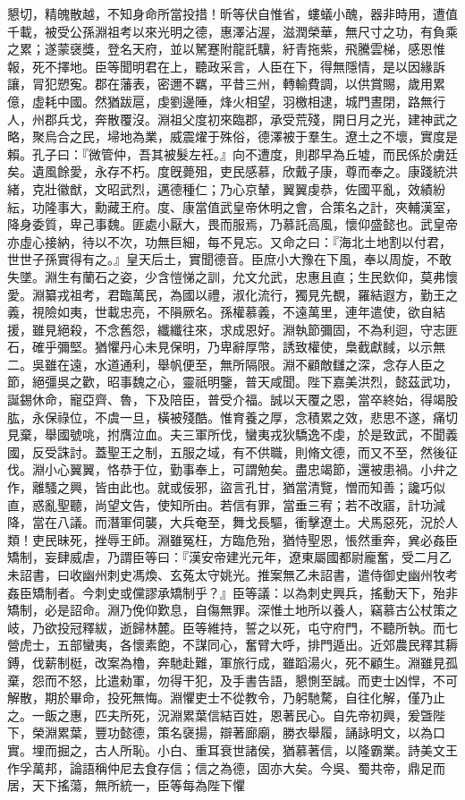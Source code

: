 \begin{pinyinscope}
懇切，精魄散越，不知身命所當投措！昕等伏自惟省，螻蟻小醜，器非時用，遭值千載，被受公孫淵祖考以來光明之德，惠澤沾渥，滋潤榮華，無尺寸之功，有負乘之累；遂蒙襃獎，登名天府，並以駑蹇附龍託驥，紆青拖紫，飛騰雲梯，感恩惟報，死不擇地。臣等聞明君在上，聽政采言，人臣在下，得無隱情，是以因緣訴讓，冐犯愬寃。郡在藩表，密邇不羈，平昔三州，轉輸費調，以供賞賜，歲用累億，虛耗中國。然猶跋扈，虔劉邊陲，烽火相望，羽檄相逮，城門晝閉，路無行人，州郡兵戈，奔散覆沒。淵祖父度初來臨郡，承受荒殘，開日月之光，建神武之略，聚烏合之民，埽地為業，威震燿于殊俗，德澤被于羣生。遼土之不壞，實度是賴。孔子曰：『微管仲，吾其被髮左衽。』向不遭度，則郡早為丘墟，而民係於虜廷矣。遺風餘愛，永存不朽。度旣薨殂，吏民感慕，欣戴子康，尊而奉之。康踐統洪緒，克壯徽猷，文昭武烈，邁德種仁；乃心京輦，翼翼虔恭，佐國平亂，效績紛紜，功隆事大，勳藏王府。度、康當值武皇帝休明之會，合策名之計，夾輔漢室，降身委質，卑己事魏。匪處小厭大，畏而服焉，乃慕託高風，懷仰盛懿也。武皇帝亦虛心接納，待以不次，功無巨細，每不見忘。又命之曰：『海北土地割以付君，世世子孫實得有之。』皇天后土，實聞德音。臣庶小大豫在下風，奉以周旋，不敢失墜。淵生有蘭石之姿，少含愷悌之訓，允文允武，忠惠且直；生民欽仰，莫弗懷愛。淵纂戎祖考，君臨萬民，為國以禮，淑化流行，獨見先覩，羅結遐方，勤王之義，視險如夷，世載忠亮，不隕厥名。孫權慕義，不遠萬里，連年遣使，欲自結援，雖見絕殺，不念舊怨，纖纖往來，求成恩好。淵執節彌固，不為利迴，守志匪石，確乎彌堅。猶懼丹心未見保明，乃卑辭厚幣，誘致權使，梟截獻馘，以示無二。吳雖在遠，水道通利，舉帆便至，無所隔限。淵不顧敵讎之深，念存人臣之節，絕彊吳之歡，昭事魏之心，靈祇明鑒，普天咸聞。陛下嘉美洪烈，懿茲武功，誕錫休命，寵亞齊、魯，下及陪臣，普受介福。誠以天覆之恩，當卒終始，得竭股肱，永保祿位，不虞一旦，橫被殘酷。惟育養之厚，念積累之效，悲思不遂，痛切見棄，舉國號咷，拊膺泣血。夫三軍所伐，蠻夷戎狄驕逸不虔，於是致武，不聞義國，反受誅討。蓋聖王之制，五服之域，有不供職，則脩文德，而又不至，然後征伐。淵小心翼翼，恪恭于位，勤事奉上，可謂勉矣。盡忠竭節，還被患禍。小弁之作，離騷之興，皆由此也。就或佞邪，盜言孔甘，猶當清覽，憎而知善；讒巧似直，惑亂聖聽，尚望文告，使知所由。若信有罪，當垂三宥；若不改寤，計功減降，當在八議。而潛軍伺襲，大兵奄至，舞戈長驅，衝擊遼土。犬馬惡死，況於人類！吏民昧死，挫辱王師。淵雖冤枉，方臨危殆，猶恃聖恩，悵然重奔，兾必姦臣矯制，妄肆威虐，乃謂臣等曰：『漢安帝建光元年，遼東屬國都尉龐奮，受二月乙未詔書，曰收幽州刺史馮煥、玄菟太守姚光。推案無乙未詔書，遣侍御史幽州牧考姦臣矯制者。今刺史或儻謬承矯制乎？』臣等議：以為刺史興兵，搖動天下，殆非矯制，必是詔命。淵乃俛仰歎息，自傷無罪。深惟土地所以養人，竊慕古公杖策之岐，乃欲投冠釋紱，逝歸林麓。臣等維持，誓之以死，屯守府門，不聽所執。而七營虎士，五部蠻夷，各懷素飽，不謀同心，奮臂大呼，排門遁出。近郊農民釋其耨鎛，伐薪制梃，改案為櫓，奔馳赴難，軍旅行成，雖蹈湯火，死不顧生。淵雖見孤棄，怨而不怒，比遣勑軍，勿得干犯，及手書告語，懇惻至誠。而吏士凶悍，不可解散，期於畢命，投死無悔。淵懼吏士不從教令，乃躬馳騖，自往化解，僅乃止之。一飯之惠，匹夫所死，況淵累葉信結百姓，恩著民心。自先帝初興，爰曁陛下，榮淵累葉，豐功懿德，策名襃揚，辯著廊廟，勝衣舉履，誦詠明文，以為口實。埋而掘之，古人所恥。小白、重耳衰世諸侯，猶慕著信，以隆霸業。詩美文王作孚萬邦，論語稱仲尼去食存信；信之為德，固亦大矣。今吳、蜀共帝，鼎足而居，天下搖蕩，無所統一，臣等每為陛下懼
\end{pinyinscope}
